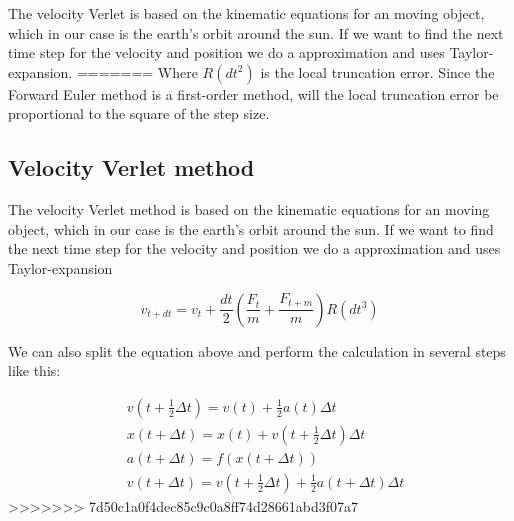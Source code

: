 \documentclass{article}
\begin{document}
\begin{multicols}{2}
The velocity Verlet is based on the kinematic equations for an moving object, which in our case is the earth's orbit around the sun. If we want to find the next time step for the velocity and position we do a approximation and uses Taylor-expansion.    
=======
Where $R(dt^2)$ is the local truncation error. Since the Forward Euler method is a first-order method, will the local truncation error be proportional to the square of the step size. 

\subsection{Velocity Verlet method}

The velocity Verlet method is based on the kinematic equations for an moving object, which in our case is the earth's orbit around the sun. If we want to find the next time step for the velocity and position we do a approximation and uses Taylor-expansion   

\begin{equation}
v_{t+dt}=v_t +\frac{dt}{2}(\frac{F_t}{m}+\frac{F_{t+m}}{m}) R(dt^3)
\label{eq:steps}
\end{equation}


We can also split the equation above and perform the calculation in several steps like this:

\begin{equation*}
\begin{split}
&v(t+\frac{1}{2}\Delta t)=v(t)+\frac{1}{2}a(t)\Delta t\\
&x(t+\Delta t)=x(t)+v(t+\frac{1}{2}\Delta t)\Delta t\\
&a(t+\Delta t)=f(x(t+\Delta t))\\
&v(t+\Delta t)=v(t+\frac{1}{2}\Delta t)+\frac{1}{2}a(t+\Delta t)\Delta t
\end{split}
\label{eq:steps}
\end{equation*}
>>>>>>> 7d50c1a0f4dec85c9c0a8ff74d28661abd3f07a7


\end{multicols}
\end{document}

